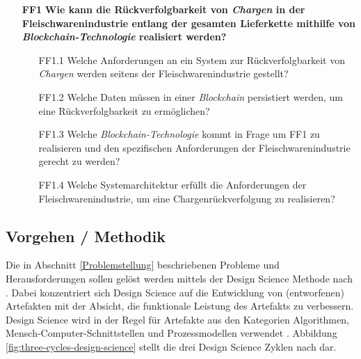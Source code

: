 \begin{itemize}
  \item[\textbf{FF1}] \textbf{Wie kann die Rückverfolgbarkeit von \textit{Chargen} in der Fleischwarenindustrie entlang der gesamten Lieferkette mithilfe von \textit{Blockchain-Technologie} realisiert werden?}
  \begin{itemize}
    \item[FF1.1] Welche Anforderungen an ein System zur Rückverfolgbarkeit von \textit{Chargen} werden seitens der Fleischwarenindustrie gestellt?
    \item[FF1.2] Welche Daten müssen in einer \textit{Blockchain} persistiert werden, um eine Rückverfolgbarkeit zu ermöglichen?
    \item[FF1.3] Welche \textit{Blockchain-Technologie} kommt in Frage um FF1 zu realisieren und den spezifischen Anforderungen der Fleischwarenindustrie gerecht zu werden?
    \item[FF1.4] Welche Systemarchitektur erfüllt die Anforderungen der Fleischwarenindustrie, um eine Chargenrückverfolgung zu realisieren?
  \end{itemize}
\end{itemize}

\subsection{Vorgehen / Methodik}\label{sec:method}

Die in Abschnitt \ref{Problemstellung} beschriebenen Probleme und Herausforderungen sollen gelöst werden mittels der Design Science Methode nach \citet{Hevner2004, Hevner2007}. Dabei konzentriert sich Design Science auf die Entwicklung von (entworfenen) Artefakten mit der Absicht, die funktionale Leistung des Artefakts zu verbessern. Design Science wird in der Regel für Artefakte aus den Kategorien Algorithmen, Mensch-Computer-Schnittstellen und Prozessmodellen verwendet \citep{Peffers2012, Kuechler2008}. Abbildung \ref{fig:three-cycles-design-science} stellt die drei Design Science Zyklen nach \citet{Hevner2010} dar.

